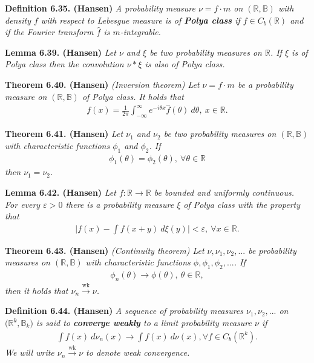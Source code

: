 \documentclass[a4paper,12pt,openany]{book}
\begin{document}
\textbf{Definition 6.35. (Hansen)} \emph{A probability measure \(\nu=f\cdot m\) on \((\mathbb{R},\mathbb{B})\) with density \(f\) with respect to Lebesgue measure is of \textbf{Polya class} if \(f\in C_b(\mathbb{R})\) and if the Fourier transform \(\hat{f}\) is \(m\)-integrable.}

\textbf{Lemma 6.39. (Hansen)} \emph{Let \(\nu\) and \(\xi\) be two probability measures on \(\mathbb{R}\). If \(\xi\) is of Polya class then the convolution \(\nu *\xi\) is also of Polya class.}

\textbf{Theorem 6.40. (Hansen)} \emph{(Inversion theorem) Let \(\nu=f\cdot m\) be a probability measure on \((\mathbb{R},\mathbb{B})\) of Polya class. It holds that}
\begin{align*}
    f(x)=\frac{1}{2\pi}\int_{-\infty}^\infty e^{-i\theta x}\hat{f}(\theta)\ d\theta,\ x\in\mathbb{R}.\tag{6.39}
\end{align*}

\textbf{Theorem 6.41. (Hansen)} \emph{Let \(\nu_1\) and \(\nu_2\) be two probability measures on \((\mathbb{R},\mathbb{B})\) with characteristic functions \(\phi_1\) and \(\phi_2\). If}
\begin{align*}
    \phi_1(\theta)=\phi_2(\theta),\ \forall \theta \in\mathbb{R}
\end{align*}
\emph{then \(\nu_1=\nu_2\).}

\textbf{Lemma 6.42. (Hansen)} \emph{Let \(f : \mathbb{R}\to\mathbb{R}\) be bounded and uniformly continuous. For every \(\varepsilon>0\) there is a probability measure \(\xi\) of Polya class with the property that}
\begin{align*}
    \Big\vert f(x)-\int f(x+y)\ d\xi(y)\Big\vert<\varepsilon,\ \forall x\in\mathbb{R}.\tag{6.43}
\end{align*}

\textbf{Theorem 6.43. (Hansen)} \emph{(Continuity theorem) Let \(\nu,\nu_1,\nu_2,...\) be probability measures on \((\mathbb{R},\mathbb{B})\) with characteristic functions \(\phi,\phi_1,\phi_2,...\). If}
\begin{align*}
    \phi_n(\theta)\to \phi(\theta),\ \theta\in\mathbb{R},\tag{6.45}
\end{align*}
\emph{then it holds that \(\nu_n\stackrel{\text{wk}}{\to}\nu\).}

\textbf{Definition 6.44. (Hansen)} \emph{A sequence of probability measures \(\nu_1,\nu_2,...\) on \(\big(\mathbb{R}^k,\mathbb{B}_k\big)\) is said to \textbf{converge weakly} to a limit probability measure \(\nu\) if}
\begin{align*}
    \int f(x)\ d\nu_n(x)\to\int f(x)\ d\nu(x), \forall f\in C_b(\mathbb{R}^k).\tag{6.46}
\end{align*}
\emph{We will write \(\nu_n\stackrel{\text{wk}}{\to}\nu\) to denote weak convergence.}
\end{document}
